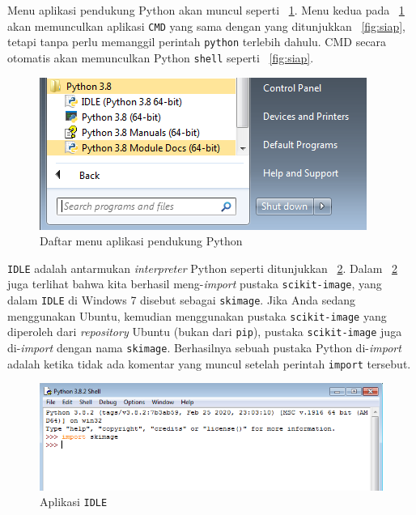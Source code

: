 Menu aplikasi pendukung Python akan muncul seperti \figurename~\ref{fig:menu}. Menu kedua pada \figurename~\ref{fig:menu} akan memunculkan aplikasi \texttt{CMD} yang sama dengan yang ditunjukkan \figurename~\ref{fig:siap}, tetapi tanpa perlu memanggil perintah \texttt{python} terlebih dahulu. CMD secara otomatis akan memunculkan Python \texttt{shell} seperti \figurename~\ref{fig:siap}.

\begin{figure}[h!]
  \begin{center}
    \includegraphics[scale=.5]{pics/menuPython.png}
    \caption{Daftar menu aplikasi pendukung Python}
    \label{fig:menu}
  \end{center}
\end{figure}

\texttt{IDLE} adalah antarmukan \textit{interpreter} Python seperti ditunjukkan \figurename~\ref{fig:idle}. Dalam \figurename~\ref{fig:idle} juga terlihat bahwa kita berhasil meng-\textit{import} pustaka \texttt{scikit-image}, yang dalam \texttt{IDLE} di Windows 7 disebut sebagai \texttt{skimage}. Jika Anda sedang menggunakan Ubuntu, kemudian menggunakan pustaka \texttt{scikit-image} yang diperoleh dari \textit{repository} Ubuntu (bukan dari \texttt{pip}), pustaka \texttt{scikit-image} juga di-\textit{import} dengan nama \texttt{skimage}. Berhasilnya sebuah pustaka Python di-\textit{import} adalah ketika tidak ada komentar yang muncul setelah perintah \texttt{import} tersebut.

\begin{figure}
  \begin{center}
    \includegraphics[scale=.5]{pics/idle.png}
    \caption{Aplikasi \texttt{IDLE}}
    \label{fig:idle}
  \end{center}
\end{figure}

